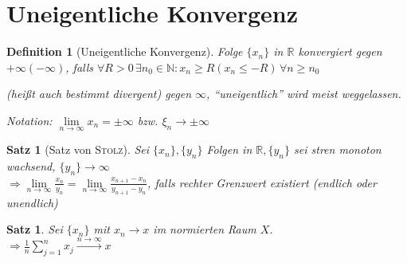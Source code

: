 \documentclass[ngerman,a4paper]{report}
\theoremstyle{break}
\newtheorem{satz}[theorem]{Satz}
\newtheorem*{definition}{Definition}
\newcommand{\person}[1]{\textsc{#1}}
\newcommand{\highlight}[1]{\emph{#1}}
\begin{document}
\section*{Uneigentliche Konvergenz}
\begin{definition}[Uneigentliche Konvergenz]
	Folge $\{x_n\}$ in $\mathbb{R}$ konvergiert  gegen $+\infty (-\infty)$, falls $\forall R>0\,\exists n_0\in\mathbb{N}: x_n \ge R (x_n \le -R)\,\forall n\ge n_0$
	
	(heißt auch \highlight{bestimmt divergent}) gegen $\infty$, "`uneigentlich"' wird meist weggelassen.
	
	Notation: $\lim\limits_{n\rightarrow\infty} x_n = \pm \infty$ bzw. $\xi_n\rightarrow \pm \infty$
\end{definition}
\begin{satz}[Satz von \person{Stolz}]
	Sei $\{x_n\},\{y_n\}$ Folgen in $\mathbb{R}, \{y_n\}$ sei stren monoton wachsend, $\{y_n\}\rightarrow\infty$\\
	$\Rightarrow \lim\limits_{n\rightarrow\infty} \frac{x_n}{y_n} = \lim\limits_{n\rightarrow\infty} \frac{x_{n+1} - x_n}{y_{n+1} - y_n}$, falls rechter Grenzwert existiert (endlich oder unendlich)
\end{satz}
\begin{satz}
	Sei $\{x_n\}$ mit $x_n\rightarrow x$ im normierten Raum $X$.\\
	$\Rightarrow\frac{1}{n}\sum_{j=1}^n x_j \overset{n\rightarrow\infty}{\longrightarrow} x$
\end{satz}
\end{document}
